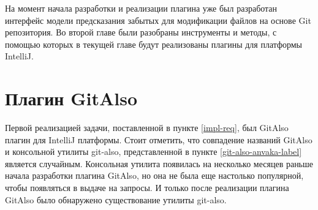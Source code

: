 На момент начала разработки и реализации плагина уже был разработан интерфейс модели предсказания забытых для модификации файлов на основе Git репозитория. Во второй главе были разобраны инструменты и методы, с помощью которых в текущей главе будут реализованы плагины для платформы IntelliJ.
\section{Плагин GitAlso}\label{git-also-main}
Первой реализацией задачи, поставленной в пункте \ref{impl-req}, был GitAlso плагин для IntelliJ платформы. Стоит отметить, что совпадение названий GitAlso и консольной утилиты git-also, представленной в пункте \ref{git-also-anvaka-label} является случайным. Консольная утилита появилась на несколько месяцев раньше начала разработки плагина GitAlso, но она не была еще настолько популярной, чтобы появляться в выдаче на запросы. И только после реализации плагина GitAlso было обнаружено существование утилиты git-also.
